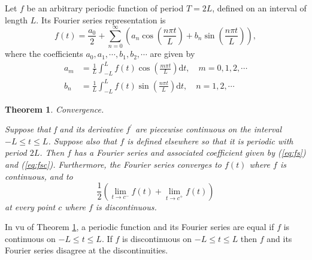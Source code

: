 \documentclass[11pt, oneside]{article}   	%
\newtheorem{theorem}{Theorem}
\begin{document}
\justify
Let $f$ be an arbitrary periodic function of period $T=2L$, defined on an interval of length $L$. Its Fourier series representation is
\begin{equation}\label{eq:fs}
f(t) = \frac{a_{0}}{2} +\sum_{n=0}^{\infty}\left( a_{n} \cos\left( \frac{n\pi t}{L}\right) + b_{n} \sin\left( \frac{n\pi t}{L}\right)  \right), \end{equation}
where the coefficients $a_{0}, a_{1}, \cdots, b_{1}, b_{2},\cdots$  are given by 
\begin{equation}\label{eq:fsc}
\begin{split}
a_{m} &= \frac{1}{L}\int_{-L}^{L}f(t)\cos\left( \frac{m\pi t}{L}\right) \mathrm{d}t,\quad m=0,1,2,\cdots\\
b_{n} &= \frac{1}{L}\int_{-L}^{L}f(t)\sin\left( \frac{n\pi t}{L}\right) \mathrm{d}t,\quad n=1,2,\cdots
\end{split}
\end{equation}
\begin{theorem}{Convergence.}\label{convergence}

\justify
Suppose that f and its derivative $f^{\prime}$ are piecewise continuous on the interval $-L \leq t \leq L$. Suppose also that $f$ is defined elsewhere so that it is periodic with period $2L$.
Then $f$ has a Fourier series and associated coefficient given by (\ref{eq:fs}) and (\ref{eq:fsc}). Furthermore, the Fourier series converges to $f(t)$ where $f$ is continuous, and to 
\begin{equation}
\frac{1}{2}\left( \lim_{t\rightarrow c^{-}}f(t) + \lim_{t\rightarrow c^{+}}f(t) \right)
\end{equation}
at every point $c$ where $f$ is discontinuous.
\end{theorem}
In vu of Theorem \ref{convergence}, a periodic function and its Fourier series are equal if $f$ is continuous on $-L \leq t \leq L$. If $f$ is discontinuous on $-L \leq t \leq L$ then $f$ and its Fourier series disagree at the discontinuities.
\end{document}
